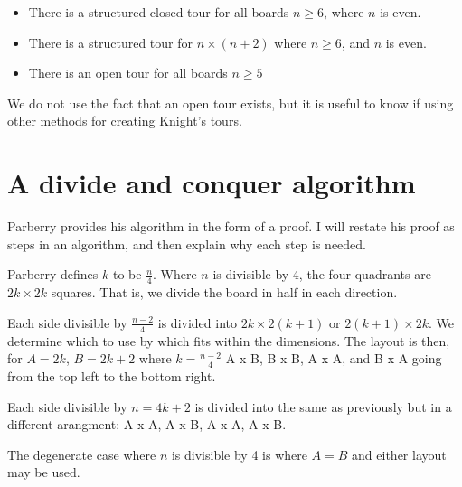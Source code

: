 \documentclass[11pt, a4paper]{article}
\begin{document}
\begin{itemize}
\item There is a structured closed tour for all boards $n \ge 6$, where $n$ is even.
\item There is a structured tour for $n \times (n + 2)$ where $n \ge 6$, and $n$ is even.
\item There is an open tour for all boards $n \ge 5$
\end{itemize}

We do not use the fact that an open tour exists, but it is useful to know if using other methods for creating Knight's tours.

\section{A divide and conquer algorithm}

Parberry provides his algorithm in the form of a proof. I will restate his proof as steps in an algorithm, and then explain why each step is needed.

Parberry defines $k$ to be $\frac{n}{4}$.
Where $n$ is divisible by 4, the four quadrants are $2k \times 2k$ squares. That is, we divide the board in half in each direction.

Each side divisible by $\frac{n - 2}{4}$ is divided into $2k \times 2(k + 1)$ or $2(k + 1) \times 2k$. We determine which to use by which fits within the dimensions. The layout is then, for $A = 2k$, $B = 2k + 2$ where $k = \frac{n - 2}{4}$ A x B, B x B, A x A, and B x A going from the top left to the bottom right.

Each side divisible by $n = 4k + 2$ is divided into the same as previously but in a different arangment: A x A, A x B, A x A, A x B.

The degenerate case where $n$ is divisible by 4 is where $A = B$ and either layout may be used.



\end{document}
